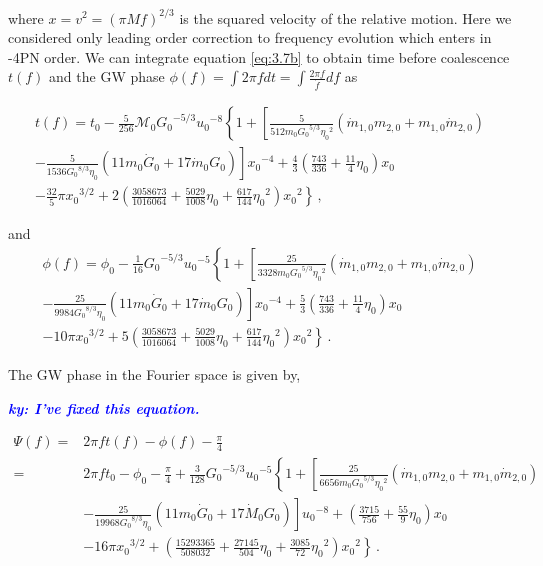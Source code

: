 \documentclass[prd,twocolumn,nofootinbib]{revtex4-1}
\newcommand{\ky}[1]{\textcolor{blue}{\it{\textbf{ky: #1}}} }
\begin{document}
where $x=v^2=(\pi M f)^{2/3}$ is the squared velocity of the relative motion. Here we considered only leading order correction to frequency evolution which enters in -4PN order. We can integrate equation \eqref{eq:3.7b} to obtain time before coalescence $t(f)$ and the GW phase $\phi(f)=\int 2 \pi f dt=\int\frac{2\pi f}{\dot{f}}df$ as


\begin{align}
t(f)=t_0-\frac{5}{256}\mathcal{M}_0{G_0}^{-5/3}{u_0}^{-8}\left\{1+\left[\frac{5}{512 {m}_0{G_0}^{5/3}{\eta_0}^2}(\dot{m}_{1,0}m_{2,0}+m_{1,0}\dot{m}_{2,0})\right. \right. \nonumber \\ \left. \left. -\frac{5}{1536{G_0}^{8/3}\eta_0}(11m_0\dot{G}_0+17\dot{m}_0 G_0)\right]{x_0}^{-4}+\frac{4}{3}\left(\frac{743}{336}+\frac{11}{4}{\eta_0}\right)x_0 \right. \nonumber\\ \left. -\frac{32}{5}\pi {x_0}^{3/2}+2\left(\frac{3058673}{1016064}+\frac{5029}{1008}{\eta_0}+\frac{617}{144}{\eta_0}^2\right){x_0}^2 \right\}\,,
\end{align}


and
\begin{align}
\phi(f)=\phi_0-\frac{1}{16}{G_0}^{-5/3}{u_0}^{-5}\left\{1+\left[\frac{25}{3328 m_0 {G_0}^{5/3}{\eta_0}^2}(\dot{m}_{1,0}m_{2,0}+m_{1,0}\dot{m}_{2,0}) \right. \right. \nonumber\\ \left. \left. -\frac{25}{9984{G_0}^{8/3} \eta_0}(11m_0 \dot{G}_0+17\dot{m}_0 G_0)\right]{x_0}^{-4}+\frac{5}{3}\left(\frac{743}{336}+\frac{11}{4}{\eta_0}\right){x_0} \right. \nonumber\\ \left. -10 \pi {x_0}^{3/2}+5\left(\frac{3058673}{1016064}+\frac{5029}{1008}{\eta_0}+\frac{617}{144}{\eta_0}^{2}\right){x_0}^2\right\}\,.
\end{align}


\hspace{15.5pt}The GW phase in the Fourier space is given by,

\ky{I've fixed this equation.}

\begin{align}\label{eq:3.7c}
\Psi(f)=&2\pi ft(f)-\phi(f)-\frac{\pi}{4}\nonumber\\
=&2\pi f t_0-\phi_0-\frac{\pi}{4}+\frac{3}{128}{G_0}^{-5/3}{u_0}^{-5}\left\{1+\left[\frac{25}{6656m_0 {G_0}^{5/3}{\eta_0}^2}(\dot{m}_{1,0}m_{2,0}+m_{1,0}\dot{m}_{2,0}) \right. \right. \nonumber\\ 
&\left. \left. -\frac{25}{19968{G_0}^{8/3}\eta_0}(11m_0\dot{G}_0+17\dot{M}_0G_0)\right]{u_0}^{-8}+\left(\frac{3715}{756} +\frac{55}{9}{\eta_0}\right){x_0} \right. \nonumber\\ 
& \left. -16\pi {x_0}^{3/2}+\left(\frac{15293365}{508032}+\frac{27145}{504}{\eta_0}+\frac{3085}{72}{\eta_0}^2\right){x_0}^2\right\}\,.
\end{align}
\end{document}
